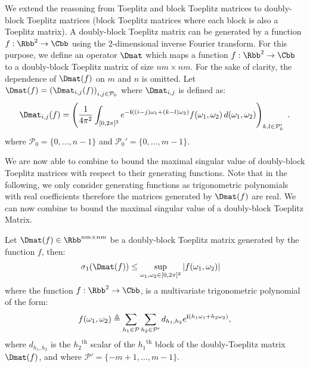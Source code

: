 We extend the reasoning from Toeplitz and block Toeplitz matrices to doubly-block Toeplitz matrices (\ie block Toeplitz matrices where each block is also a Toeplitz matrix).
A doubly-block Toeplitz matrix can be generated by a function $f: \Rbb^2 \rightarrow \Cbb$ using the 2-dimensional inverse Fourier transform.
For this purpose, we define an operator $\Dmat$ which maps a function $f: \Rbb^2 \rightarrow \Cbb$ to a doubly-block Toeplitz matrix of size $nm \times nm$.
For the sake of clarity, the dependence of $\Dmat(f)$  on $m$ and $n$ is omitted.
Let $\Dmat(f) = \leftmat \Dmat_{i,j}(f)\rightmat_{i,j \in \mathcal{P}_0}$ where $\Dmat_{i,j}$ is defined as:
\begin{equation} \label{equation:doubly_block_toeplitz_operator}
  \Dmat_{i,j}(f) = \leftmat \frac{1}{4\pi^{2}} \int_{[0,2\pi]^{2}} e^{- \ci \left((i-j)\omega_{1}+(k-l)\omega_{2}\right)}f(\omega_{1},\omega_{2})\,d(\omega_{1},\omega_{2}) \rightmat_{k,l \in \mathcal{P}_0'} \enspace.
\end{equation}
where $\mathcal{P}_0 = \{0, \dots, n-1 \}$ and $\mathcal{P}_0' = \{0, \dots, m-1 \}$.

We are now able to combine  to bound the maximal singular value of doubly-block Toeplitz matrices with respect to their generating functions. 
Note that in the following, we only consider generating functions as trigonometric polynomials with real coefficients therefore the matrices generated by $\Dmat(f)$ are real. We can now combine  to bound the maximal singular value of a doubly-block Toeplitz Matrix. 

\begin{maintheorem} \label{theorem:doubly_block_teoplitz_sup_singular}
  Let $\Dmat(f) \in \Rbb^{nm \times nm}$ be a doubly-block Toeplitz matrix generated by the function $f$, then:
  \begin{align}
    \sigma_{1} \left( \Dmat(f) \right) &\leq \sup_{\omega_1, \omega_2 \in [0, 2\pi]^2}|f(\omega_1,\omega_2)|
  \end{align}
  where the function $f: \Rbb^2 \rightarrow \Cbb$, is a multivariate trigonometric polynomial of the form:
  \begin{equation}\label{equation:muli_variate_poly_on_M}
      f(\omega_1, \omega_2) \triangleq \sum_{h_1 \in \mathcal{P}} \sum_{h_2 \in \mathcal{P}'} d_{h_1, h_2} e^{\mathbf{i} (h_1 \omega_1 + h_2 \omega_2)},
  \end{equation}
  where $d_{h_{1},h_{2}}$ is the ${h_2}^\textrm{th}$ scalar of the ${h_1}^\textrm{th}$ block of the doubly-Toeplitz matrix $\Dmat(f)$, and where $\mathcal{P}' = \{-m+1, \dots, m-1\}$.
\end{maintheorem}


